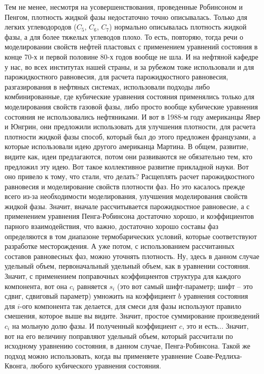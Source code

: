 \documentclass[main.tex]{subfiles}
\begin{document}
Тем не менее, несмотря на усовершенствования, проведенные Робинсоном и Пенгом, плотность жидкой фазы недостаточно точно описывалась.
Только для легких углеводородов ($C_5$, $C_6$, $C_7$) нормально описывалась плотность жидкой фазы, а для более тяжелых углеводов плохо.
То есть, повторяю, тогда речи о моделировании свойств нефтей пластовых с применением уравнений состояния в конце 70-х и первой половине 80-х годов вообще не шла.
И на нефтяной кафедре у нас, во всех институтах нашей страны, и за рубежом тоже использовали и для парожидкостного равновесия, для расчета парожидкостного равновесия, разгазирования в нефтяных системах, использовали подходы либо комбинированные, где кубические уравнения состояния применялись только для моделирования свойств газовой фазы, либо просто вообще кубические уравнения состояния не использовались нефтяниками.
И вот в 1988-м году американцы Явер и Юнгрин, они предложили использовать для улучшения плотности, для расчета плотности жидкой фазы способ, который был до этого предложен французами, а которые использовали идею другого американца Мартина.
В общем, развитие, видите как, идеи предлагаются, потом они развиваются не обязательно тем, кто предложил эту идею.
Вот такое коллективное развитие прикладной науки.
Вот оно привело к тому, что стали, что делать?
Расщеплять расчет парожидкостного равновесия и моделирование свойств плотности фаз.
Но это касалось прежде всего из-за необходимости моделирования, улучшения моделирования свойств жидкой фазы.
Значит, вначале рассчитывается парожидкостное равновесие, а с применением уравнения Пенга-Робинсона достаточно хорошо, и коэффициентов парного взаимодействия, что важно, достаточно хорошо составы фаз определяются в том диапазоне термобарических условий, которые соответствуют разработке месторождения.
А уже потом, с использованием рассчитанных составов равновесных фаз, можно уточнять плотность.
Ну, здесь в данном случае удельный объем, первоначальный удельный объем, как в уравнении состояния.
Значит, с применением поправочных коэффициентов структура для каждого компонента, вот она $c_i$ равняется $s_i$ (это вот самый шифт-параметр; шифт -- это сдвиг, сдвиговый параметр) умножить на коэффициент $b$ уравнения состояния для $i$-ого компонента так делается, для смеси для фазы используют правило смешения, которое выше вы видите.
Значит, простое суммирование произведений $c_i$ на мольную долю фазы.
И полученный коэффициент $c$, это и есть...
Значит, вот на его величину поправляют удельный объем, который рассчитали по исходному уравнению состояния, в данном случае, Пенга-Робинсона.
Такой же подход можно использовать, когда вы применяете уравнение Соаве-Редлиха-Квонга, любого кубического уравнения состояния.
\end{document}
